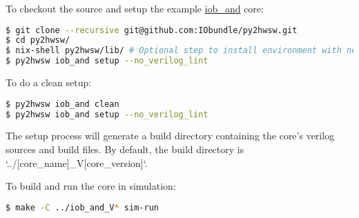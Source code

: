 %

To checkout the source and setup the
example \href{https://github.com/IObundle/py2hwsw/tree/main/py2hwsw/lib/hardware/basic_tests/iob_and}{iob\_and}
core:

\begin{lstlisting}[language=bash]
$ git clone --recursive git@github.com:IObundle/py2hwsw.git
$ cd py2hwsw/
$ nix-shell py2hwsw/lib/ # Optional step to install environment with necessary dependencies
$ py2hwsw iob_and setup --no_verilog_lint
\end{lstlisting}

To do a clean setup:

\begin{lstlisting}[language=bash]
$ py2hwsw iob_and clean
$ py2hwsw iob_and setup --no_verilog_lint
\end{lstlisting}

The setup process will generate a build directory containing the core's verilog sources and build files.
By default, the build directory is `../[core\_name]\_V[core\_version]`.

To build and run the core in simulation:
\begin{lstlisting}[language=bash]
$ make -C ../iob_and_V* sim-run
\end{lstlisting}
